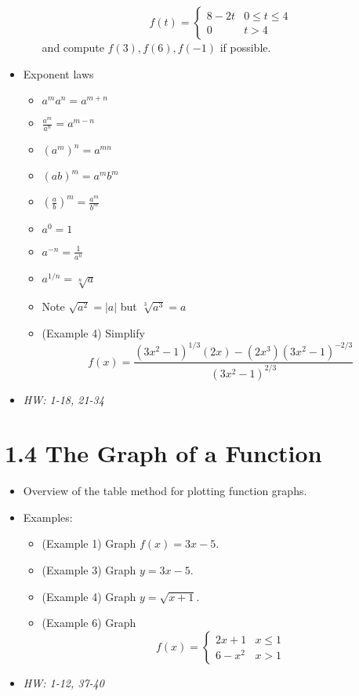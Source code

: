 \documentclass[11pt]{article}
\begin{document}
\begin{itemize}
\begin{itemize}
          \[ f(t) =
          \begin{cases}
            8-2t & 0\leq t\leq 4 \\
            0 & t>4
          \end{cases}
          \]
          and compute \(f(3),f(6),f(-1)\) if possible.
  \end{itemize}
\item Exponent laws
  \begin{itemize}
    \item \(a^ma^n=a^{m+n}\)
    \item \(\frac{a^m}{a^n}=a^{m-n}\)
    \item \((a^m)^n=a^{mn}\)
    \item \((ab)^m=a^mb^m\)
    \item \((\frac{a}{b})^m=\frac{a^m}{b^m}\)
    \item \(a^0=1\)
    \item \(a^{-n}=\frac{1}{a^n}\)
    \item \(a^{1/n}=\sqrt[n]{a}\)
    \item Note \(\sqrt{a^2}=|a|\) but \(\sqrt[3]{a^3}=a\)
    \item (Example 4) Simplify
          \[
            f(x)
              =
            \frac{
              (3x^2-1)^{1/3}(2x)-(2x^3)(3x^2-1)^{-2/3}
            }{
              (3x^2-1)^{2/3}
            }
          \]
  \end{itemize}
  \item\textit{
    HW: 1-18, 21-34
  }
\end{itemize}

\section*{1.4 The Graph of a Function}

\begin{itemize}
\item Overview of the table method for plotting function graphs.
\item Examples:
  \begin{itemize}
  \item (Example 1) Graph \(f(x)=3x-5\).
  \item (Example 3) Graph \(y=3x-5\).
  \item (Example 4) Graph \(y=\sqrt{x+1}\).
  \item (Example 6) Graph
    \[
      f(x)=
        \begin{cases}
          2x+1 & x\leq 1 \\
          6-x^2 & x>1
        \end{cases}
    \]
  \end{itemize}

\item\textit{
  HW: 1-12, 37-40
}
\end{itemize}
\end{document}
